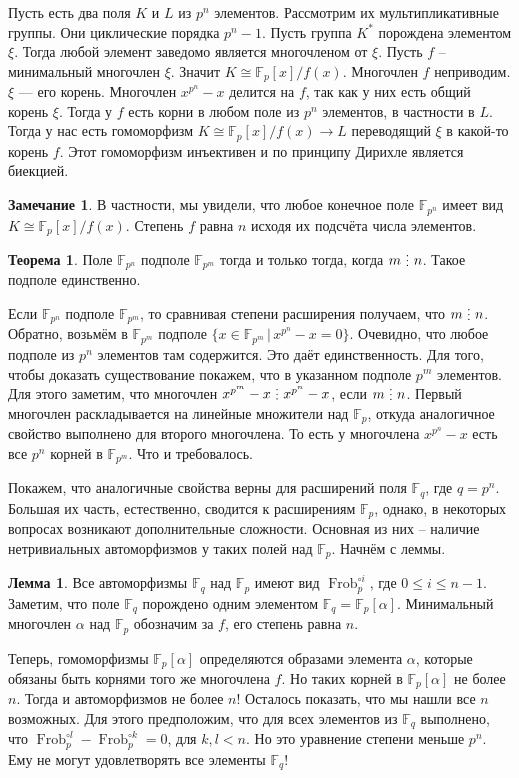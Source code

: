 \documentclass[10pt,a4paper,oneside]{book}
\theoremstyle{definition}
\newtheorem*{rem}{Замечание}
\newtheorem{thm}{{\color{red!40!black} Теорема}}
\newtheorem{lem}{{\color{green!50!black} Лемма}}
\newcommand{\mb}[1]{\mathbb{#1}}
\newcommand{\Frob}{\operatorname{Frob}}
\newcommand{\di}{\mathop{\,\scalebox{0.85}{\raisebox{-1.2pt}[0.5\height]{\vdots}}\,}}
\def\thrm{\begin{thm}}
\def\ethrm{\end{thm}}
\def\lm{\begin{lem}}
\def\elm{\end{lem}}
\def\rm{\begin{rem}}
\def\erm{\end{rem}}
\begin{document}
Пусть есть два поля $K$ и $L$ из $p^n$ элементов. Рассмотрим их мультипликативные группы. Они циклические порядка $p^n-1$. Пусть группа $K^*$ порождена элементом $\xi$. Тогда любой элемент заведомо является многочленом от $\xi$. Пусть $f$ -- минимальный многочлен $\xi$. Значит $K\cong\mb F_p[x]/f(x)$. Многочлен $f$ неприводим. $\xi$ --- его корень. Многочлен $x^{p^n}-x$ делится на $f$, так как у них есть общий корень $\xi$. Тогда у $f$ есть корни в любом поле из $p^n$ элементов, в частности в $L$. Тогда у нас есть гомоморфизм  $K\cong\mb F_p[x]/f(x)\to L$ переводящий $\xi$ в какой-то корень $f$. Этот гомоморфизм инъективен и по принципу Дирихле является биекцией. 
\endproof

\rm В частности, мы увидели, что любое конечное поле $\mb F_{p^n}$ имеет вид $K\cong\mb F_p[x]/f(x)$. Степень $f$ равна $n$ исходя их подсчёта числа элементов.
\erm


\thrm Поле $\mb F_{p^n}$ подполе $\mb F_{p^m}$ тогда и только тогда, когда $m\di n$. Такое подполе единственно.
\ethrm 
\proof
Если $\mb F_{p^n}$ подполе $\mb F_{p^m}$, то сравнивая степени расширения получаем, что $m \di n$. Обратно, возьмём в $\mb F_{p^m}$ подполе $\{x \in \mb F_{p^m} \,|\, x^{p^n}-x=0\}$. Очевидно, что любое подполе из $p^n$ элементов там содержится. Это даёт единственность. Для того, чтобы доказать существование покажем, что в указанном подполе $p^m$ элементов. Для этого заметим, что многочлен $x^{p^m}-x \di x^{p^n}-x$, если $m \di n$. Первый многочлен раскладывается на линейные множители над $\mb F_p$, откуда аналогичное свойство выполнено для второго многочлена. То есть у многочлена $x^{p^n}-x$ есть все $p^n$ корней в $\mb F_{p^m}$. Что и требовалось. 
\endproof



Покажем, что аналогичные свойства верны для расширений поля $\mb F_q$, где $q=p^n$. Большая их часть, естественно, сводится к расширениям $\mb F_p$, однако, в некоторых вопросах возникают дополнительные сложности. Основная из них -- наличие нетривиальных автоморфизмов у таких полей над $\mb F_p$. Начнём с леммы.

\lm Все автоморфизмы $\mb F_q$ над $\mb F_p$ имеют вид $\Frob_p^{\circ i}$, где $0\leq i \leq n-1$. 
\proof Заметим, что поле $\mb F_q$ порождено одним элементом $\mb F_q =\mb F_p[\alpha]$. Минимальный многочлен $\alpha$ над $\mb F_p$ обозначим за $f$, его степень равна $n$. 

Теперь, гомоморфизмы $\mb F_p[\alpha]$ определяются образами элемента $\alpha$, которые обязаны быть корнями того же многочлена $f$. Но таких корней в $\mb F_p[\alpha]$ не более $n$. Тогда и автоморфизмов не более $n$! Осталось показать, что мы нашли все $n$ возможных. Для этого предположим, что для всех элементов из $\mb F_q$ выполнено, что $\Frob_p^{\circ l} - \Frob_p^{\circ k}=0$, для $k,l<n$. Но это уравнение степени меньше $p^n$. Ему не могут удовлетворять все элементы $\mb F_q$!
\endproof
\elm
\end{document}
